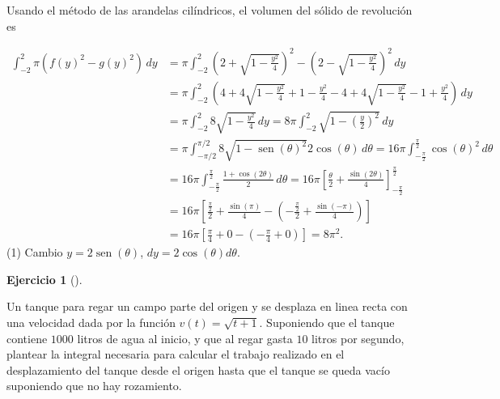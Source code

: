 \documentclass[
  spanish,
  a4paper,
]{scrreport}
\theoremstyle{definition}
\newtheorem{exercise}{Ejercicio}[chapter]
\theoremstyle{remark}
\begin{document}
\begin{tcolorbox}
Usando el método de las arandelas cilíndricos, el volumen del sólido de
revolución es

\begin{align*}
\int_{-2}^2 \pi (f(y)^2 -g(y)^2)\,dy
&= \pi \int_{-2}^2 \left(2+\sqrt{1-\frac{y^2}{4}}\right)^2 - \left(2-\sqrt{1-\frac{y^2}{4}}\right)^2 \,dy \\
&= \pi \int_{-2}^2 \left(4+4\sqrt{1-\frac{y^2}{4}} + 1-\frac{y^2}{4} - 4 + 4\sqrt{1-\frac{y^2}{4}} - 1+\frac{y^2}{4}\right) \,dy \\
&= \pi \int_{-2}^2 8\sqrt{1-\frac{y^2}{4}} \,dy
=8\pi \int_{-2}^2 \sqrt{1-\left(\frac{y}{2}\right)^2} \,dy \tag{1} \\
&= \pi \int_{-\pi/2}^{\pi/2} 8\sqrt{1-\operatorname{sen}(\theta)^2} 2\cos(\theta)\,d\theta
= 16\pi \int_{-\frac{\pi}{2}}^{\frac{\pi}{2}} \cos(\theta)^2\,d\theta \\
&= 16\pi \int_{-\frac{\pi}{2}}^{\frac{\pi}{2}} \frac{1+\cos(2\theta)}{2}\,d\theta
= 16\pi \left[\frac{\theta}{2} + \frac{\sin(2\theta)}{4}\right]_{-\frac{\pi}{2}}^{\frac{\pi}{2}} \\
&= 16\pi \left[\frac{\frac{\pi}{2}}{2} + \frac{\sin(\pi)}{4} - \left(-\frac{\frac{\pi}{2}}{2} + \frac{\sin(-\pi)}{4}\right)\right] \\
&= 16\pi \left[\frac{\pi}{4} + 0 - \left(-\frac{\pi}{4} + 0\right)\right]
= 8\pi^2.
\end{align*} (1) Cambio \(y = 2\operatorname{sen}(\theta)\),
\(dy = 2\cos(\theta)d\theta\).

\end{tcolorbox}

\begin{exercise}[]\protect\hypertarget{exr-4}{}\label{exr-4}

Un tanque para regar un campo parte del origen y se desplaza en linea
recta con una velocidad dada por la función \(v(t) = \sqrt{t+1}\).
Suponiendo que el tanque contiene \(1000\) litros de agua al inicio, y
que al regar gasta \(10\) litros por segundo, plantear la integral
necesaria para calcular el trabajo realizado en el desplazamiento del
tanque desde el origen hasta que el tanque se queda vacío suponiendo que
no hay rozamiento.

\end{exercise}
\end{document}
